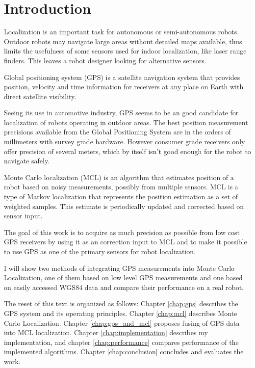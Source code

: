 \chapter{Introduction}

Localization is an important task for autonomous or semi-autonomous robots.
Outdoor robots may navigate large areas without detailed maps available, thus limits
the usefulness of some sensors used for indoor localization, like laser range finders.
This leaves a robot designer looking for alternative sensors.


Global positioning system (GPS) is a satellite navigation system that
provides position, velocity and time information for receivers at any place on Earth with direct
satellite visibility.

Seeing its use in automotive industry, GPS seems to be an good candidate for
localization of robots operating in outdoor areas.
The best position measurement precisions available from the Global Positioning System
are in the orders of millimeters with survey grade hardware.
However consumer grade receivers only offer precision of several meters, which
by itself isn't good enough for the robot to navigate safely.


Monte Carlo localization (MCL) is an algorithm that estimates position of a robot
based on noisy measurements, possibly from multiple sensors.
MCL is a type of Markov localization that represents the position estimation as
a set of weighted samples.
This estimate is periodically updated and corrected based on sensor input.


\vspace{1.5em}


The goal of this work is to acquire as much precision as possible from low cost
GPS receivers by using it as an correction input to MCL and to make it possible to use
GPS as one of the primary sensors for robot localization.

I will show two methods of integrating GPS measurements into Monte Carlo Localization,
one of them based on low level GPS measurements and one based on easily accessed WGS84 data
and compare their performance on a real robot.



The reset of this text is organized as follows:
Chapter \ref{chap:gps} describes the GPS system and its operating principles.
Chapter \ref{chap:mcl} describes Monte Carlo Localization.
Chapter \ref{chap:gps_and_mcl} proposes fusing of GPS data into MCL localization.
Chapter \ref{chap:implementation} describes my implementation,
and chapter \ref{chap:performance} compares performance of the implemented algorithms.
Chapter \ref{chap:conclusion} concludes and evaluates the work.
